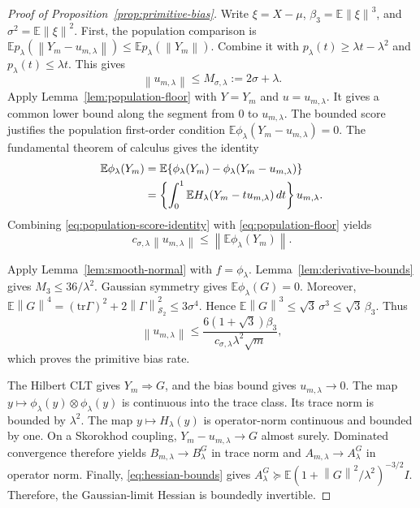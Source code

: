 \documentclass[twoside]{article}
\theoremstyle{definition}
\newcommand{\E}{\mathbb E}
\newcommand{\norm}[1]{\left\lVert #1\right\rVert}
\newcommand{\tr}{\mathrm{tr}}
\begin{document}
\begin{proof}[Proof of Proposition~\ref{prop:primitive-bias}]
Write $\xi=X-\mu$, $\beta_3=\E\norm\xi^3$, and $\sigma^2=\E\norm\xi^2$. First, the population comparison is
$\E p_\lambda(\norm{Y_m-u_{m,\lambda}})\le\E p_\lambda(\norm{Y_m})$.
Combine it with $p_\lambda(t)\ge\lambda t-\lambda^2$ and $p_\lambda(t)\le\lambda t$. This gives
\begin{equation}\label{eq:um-uniform}
    \norm{u_{m,\lambda}}\le M_{\sigma,\lambda}:=2\sigma+\lambda.
\end{equation}
Apply Lemma~\ref{lem:population-floor} with $Y=Y_m$ and $u=u_{m,\lambda}$. It gives a common lower bound along the segment from $0$ to $u_{m,\lambda}$. The bounded score justifies the population first-order condition $\E\phi_\lambda(Y_m-u_{m,\lambda})=0$. The fundamental theorem of calculus gives the identity
\begin{align}
\E\phi_\lambda(Y_m)
&=\E\{\phi_\lambda(Y_m)-\phi_\lambda(Y_m-u_{m,\lambda})\}\notag\\
&=\left\{\int_0^1\E H_\lambda(Y_m-tu_{m,\lambda})\,dt\right\}u_{m,\lambda}.
\label{eq:population-score-identity}
\end{align}
Combining \eqref{eq:population-score-identity} with \eqref{eq:population-floor} yields
\begin{equation*}
    c_{\sigma,\lambda}\norm{u_{m,\lambda}}
    \le\norm{\E\phi_\lambda(Y_m)}.
\end{equation*}

Apply Lemma~\ref{lem:smooth-normal} with $f=\phi_\lambda$. Lemma~\ref{lem:derivative-bounds} gives $M_3\le36/\lambda^2$. Gaussian symmetry gives $\E\phi_\lambda(G)=0$. Moreover, $\E\norm G^4=(\tr\Gamma)^2+2\norm{\Gamma}_{\mathcal S_2}^2\le3\sigma^4$. Hence $\E\norm G^3\le\sqrt3\,\sigma^3\le\sqrt3\,\beta_3$. Thus
\[
    \norm{u_{m,\lambda}}
    \le \frac{6(1+\sqrt3)\beta_3}
    {c_{\sigma,\lambda}\lambda^2\sqrt m},
\]
which proves the primitive bias rate.

The Hilbert CLT gives $Y_m\Rightarrow G$, and the bias bound gives $u_{m,\lambda}\to0$. The map $y\mapsto\phi_\lambda(y)\otimes\phi_\lambda(y)$ is continuous into the trace class. Its trace norm is bounded by $\lambda^2$. The map $y\mapsto H_\lambda(y)$ is operator-norm continuous and bounded by one. On a Skorokhod coupling, $Y_m-u_{m,\lambda}\to G$ almost surely. Dominated convergence therefore yields
$B_{m,\lambda}\to B_\lambda^G$ in trace norm and
$A_{m,\lambda}\to A_\lambda^G$ in operator norm. Finally, \eqref{eq:hessian-bounds} gives
$A_\lambda^G\succeq\E(1+\norm G^2/\lambda^2)^{-3/2}I$.
Therefore, the Gaussian-limit Hessian is boundedly invertible.
\end{proof}
\end{document}
